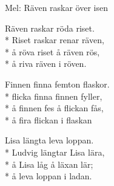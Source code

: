 \begin{SongText}
    \begin{SongInfo}
        Mel: Räven raskar över isen
    \end{SongInfo}
    \begin{SongVerse}
        Räven raskar röda riset.\\*%
        Riset raskar renar räven,\\*%
        å röva riset å räven rös,\\*%
        å riva räven i röven.
    \end{SongVerse}
    \begin{SongVerse}
        Finnen finna femton flaskor.\\*%
        flicka finna finnen fyller,\\*%
        å finnen fes å flickan fås,\\*%
        å fira flickan i flaskan
    \end{SongVerse}
    \begin{SongVerse}
        Lisa längta leva loppan.\\*%
        Ludvig längtar Lisa lära,\\*%
        å Lisa låg å läxan lär;\\*%
        å leva loppan i ladan.
    \end{SongVerse}
\end{SongText}
\newpage